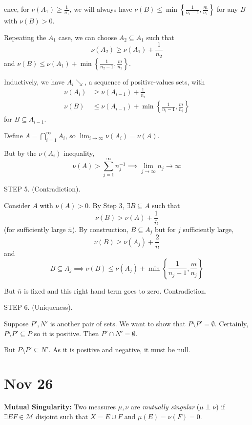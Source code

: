 \documentclass[12pt]{report}
\newcommand{\M}{\mathcal{M}}
\newcommand{\sub}{\subseteq}
\renewcommand{\bar}[1]{\overline{#1}}
\newcommand*{\tbf}[1]{\ifmmode\mathbf{#1}\else\textbf{#1}\fi}
\newenvironment*{tbox}[2][gray]{
    \begin{tcolorbox}[
        parbox=false,
        colback=#1!5!white,
        colframe=#1!75!black,
        breakable,
        title={#2}
    ]}
    {\end{tcolorbox}}
\begin{document}
\begin{tbox}
            Hence, for $\nu(A_1) \geq \frac{1}{n_1}$, we will always have $\nu(B) \leq \min\left\{\frac{1}{n_1 - 1}, \frac{m}{n_1}\right\}$ for any $B$ with $\nu(B) > 0$. 

            Repeating the $A_1$ case, we can choose $A_2 \sub A_1$ such that 
            \[\nu(A_2) \geq \nu(A_1) + \frac{1}{n_2}\]
            and $\nu(B) \leq \nu(A_1) + \min\left\{\frac{1}{n_2- 1}, \frac{m}{n_2}\right\}$. 

            Inductively, we have $A_i \searrow$, a sequence of positive-values sets, with 
            \begin{align*}
                \nu(A_i) &\geq \nu(A_{i-1}) + \frac{1}{n_i}\\ 
                \nu(B) &\leq \nu(A_{i-1}) + \min\left\{\frac{1}{n_i - 1}, \frac{m}{n_i}\right\}
            \end{align*}
            for $B \sub A_{i-1}$. 

            Define $A = \bigcap_{i=1}^\infty A_i$, so $\lim_{i \to \infty} \nu(A_i) = \nu(A)$.

            But by the $\nu(A_i)$ inequality, 
            \[\nu(A) > \sum_{j=1}^{\infty} n_j^{-1} \implies \lim_{j \to \infty} n_j \to \infty\]

            STEP 5. (Contradiction). 

            Consider $A$ with $\nu(A) > 0$. By Step 3, $\exists B \sub A$ such that 
            \[\nu(B) > \nu(A) + \frac{1}{\bar n}\] 
            (for sufficiently large $\bar n$). By construction, $B \sub A_{j}$ but for $j$ sufficiently large, 
            \[\nu(B) \geq \nu(A_j) + \frac{2}{\bar n}\]
            and 
            \[B \sub A_j \implies \nu(B) \leq \nu(A_j) + \min\left\{\frac{1}{n_j - 1}, \frac{m}{n_j}\right\}\]

            But $\bar n$ is fixed and this right hand term goes to zero. Contradiction. 

            STEP 6. (Uniqueness).

            Suppose $P', N'$ is another pair of sets. We want to show that $P \setminus P' = \emptyset$. Certainly, $P \setminus P' \sub P$ so it is positive. Then $P' \cap N' = \emptyset$. 

            But $P \setminus P' \sub N'$. As it is positive and negative, it must be null.
        \end{tbox}

\section*{Nov 26}
    \tbf{Mutual Singularity:} Two measures $\mu, \nu$ are \emph{mutually singular} ($\mu \perp \nu$) if $\exists E F \in \M$ disjoint such that $X = E \cup F$ and $\mu(E) = \nu(F) = 0$.
\end{document}
